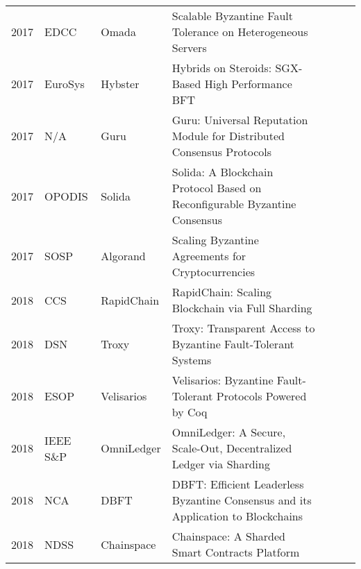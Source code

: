 \documentclass{article}
\begin{document}
\begin{landscape}
\begin{longtable}[c]{llll|l|l|l|}
2017 & EDCC              & Omada                   & Scalable Byzantine Fault Tolerance on Heterogeneous Servers                               &            &          &              \\ \cline{5-7} 
2017 & EuroSys           & Hybster                 & Hybrids on Steroids: SGX-Based High Performance BFT                                       &            &          &              \\ \cline{5-7} 
2017 & N/A               & Guru                    & Guru: Universal Reputation Module for Distributed Consensus Protocols                     &            &          &              \\ \cline{5-7} 
2017 & OPODIS            & Solida                  & Solida: A Blockchain Protocol Based on Reconfigurable Byzantine Consensus                 &            &          &              \\ \cline{5-7} 
2017 & SOSP              & Algorand                & Scaling Byzantine Agreements for Cryptocurrencies                                         &            &          &              \\ \cline{5-7} 
2018 & CCS               & RapidChain              & RapidChain: Scaling Blockchain via Full Sharding                                          &            &          &              \\ \cline{5-7} 
2018 & DSN               & Troxy                   & Troxy: Transparent Access to Byzantine Fault-Tolerant Systems                             &            &          &              \\ \cline{5-7} 
2018 & ESOP              & Velisarios              & Velisarios: Byzantine Fault-Tolerant Protocols Powered by Coq                             &            &          &              \\ \cline{5-7} 
2018 & IEEE S\&P         & OmniLedger              & OmniLedger: A Secure, Scale-Out, Decentralized Ledger via Sharding                        &            &          &              \\ \cline{5-7} 
2018 & NCA               & DBFT                    & DBFT: Efficient Leaderless Byzantine Consensus and its Application to Blockchains         &            &          &              \\ \cline{5-7} 
2018 & NDSS              & Chainspace              & Chainspace: A Sharded Smart Contracts Platform                                            &            &          &              \\ \cline{5-7} 

\end{longtable}
\end{landscape}
\end{document}
